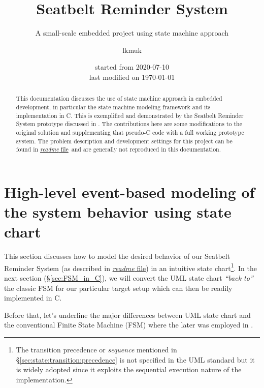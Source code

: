 \documentclass[12pt,a4paper]{scrartcl}
\title{Seatbelt Reminder System}
\subtitle{A small-scale embedded project using state machine approach}
\author{lkmuk}
\date{{\small started from 2020-07-10  \raggedleft  \\ last modified on \today \raggedleft \\}}
\newcommand{\readme}{\href{../readme.md}{\textit{readme} file}}
\begin{document}
	\maketitle
	\begin{abstract}
		This documentation discusses the use of state machine approach in embedded development, in particular the state machine modeling framework and its implementation in C. 
		This is exemplified and demonstrated by the Seatbelt Reminder System prototype discussed in \cite{Wolf}. 
		The contributions here are 
		some modifications to the original solution and 
		supplementing that pseudo-C code with a full working prototype system.
		The problem description and development settings for this project can be found in \readme~and are generally not reproduced in this documentation.
	\end{abstract}
{\tableofcontents}

	

\section{High-level event-based modeling of the system {behavior} using state chart} \label{sec:UML_Statechart}
	This section discusses how to model the desired behavior of our Seatbelt Reminder System (as described in \readme) in an intuitive state chart\footnote{The transition precedence or \textit{sequence} mentioned in \S \ref{sec:state:transition:precedence} is not specified in the UML standard but it is widely adopted since it exploits the sequential execution nature of the implementation.}. 
	In the next section (\S \ref{sec:FSM_in_C}), we will convert the UML state chart \textit{``back to''} the classic FSM for our particular target setup 
	which can then be readily implemented in C.
	
	Before that, let's underline the major differences between UML state  chart and the conventional Finite State Machine (FSM) where the later was employed in \cite{Wolf}.
	
\end{document}
